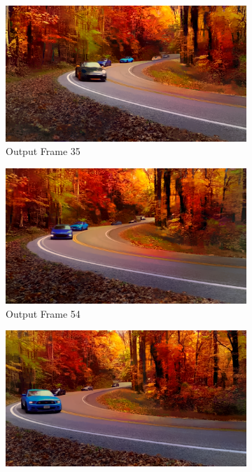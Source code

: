 \documentclass[runningheads]{llncs}
\begin{document}
\begin{figure}[h!]
\begin{subfigure}[t]{0.3\linewidth}
    \centering
    \includegraphics[width=1\linewidth]{cars/best35.png}
    \caption{Output Frame 35}
\end{subfigure}
\begin{subfigure}[t]{0.3\linewidth}
    \centering
    \includegraphics[width=1\linewidth]{cars/best54.png}
    \caption{Output Frame 54}
\end{subfigure}
\begin{subfigure}[t]{0.3\linewidth}
    \centering
    \includegraphics[width=1\linewidth]{cars/best82.png}

\end{subfigure}
\end{figure}
\end{document}

